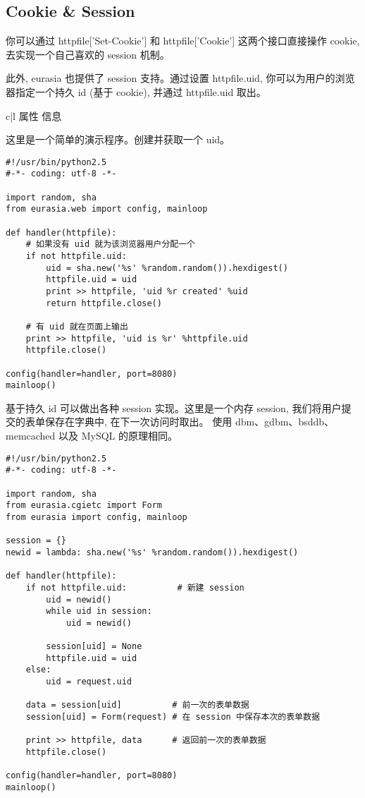 \documentclass{manual}
\begin{document}

\subsection{Cookie \& Session}

你可以通过 httpfile['Set-Cookie'] 和 httpfile['Cookie'] 这两个接口直接操作 cookie, 去实现一个自己喜欢的 session 机制。

此外, eurasia 也提供了 session 支持。通过设置 httpfile.uid, 你可以为用户的浏览器指定一个持久 id (基于 cookie), 并通过 httpfile.uid 取出。

\begin{tableii}{c|l}{}{ 属性 }{ 信息 }
\end{tableii}

这里是一个简单的演示程序。创建并获取一个 uid。

\begin{verbatim}
#!/usr/bin/python2.5
#-*- coding: utf-8 -*-

import random, sha
from eurasia.web import config, mainloop

def handler(httpfile):
	# 如果没有 uid 就为该浏览器用户分配一个
	if not httpfile.uid:
		uid = sha.new('%s' %random.random()).hexdigest()
		httpfile.uid = uid
		print >> httpfile, 'uid %r created' %uid
		return httpfile.close()

	# 有 uid 就在页面上输出
	print >> httpfile, 'uid is %r' %httpfile.uid
	httpfile.close()

config(handler=handler, port=8080)
mainloop()
\end{verbatim}

基于持久 id 可以做出各种 session 实现。这里是一个内存 session,
我们将用户提交的表单保存在字典中, 在下一次访问时取出。
使用 dbm、gdbm、bsddb、memcached 以及 MySQL 的原理相同。

\begin{verbatim}
#!/usr/bin/python2.5
#-*- coding: utf-8 -*-

import random, sha
from eurasia.cgietc import Form
from eurasia import config, mainloop

session = {}
newid = lambda: sha.new('%s' %random.random()).hexdigest()

def handler(httpfile):
	if not httpfile.uid:          # 新建 session
		uid = newid()
		while uid in session:
			uid = newid()

		session[uid] = None
		httpfile.uid = uid
	else:
		uid = request.uid

	data = session[uid]          # 前一次的表单数据
	session[uid] = Form(request) # 在 session 中保存本次的表单数据

	print >> httpfile, data      # 返回前一次的表单数据
	httpfile.close()

config(handler=handler, port=8080)
mainloop()
\end{verbatim}
\end{document}
